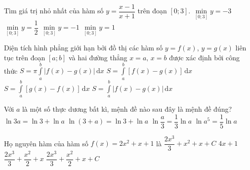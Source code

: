 \begin{ex}%
	Tìm giá trị nhỏ nhất của hàm số $y=\dfrac{x-1}{x+1}$ trên đoạn $[0;3]$.
	\choice
	{$\min\limits_{[0;3]} y=-3$}
	{$\min\limits_{[0;3]}  y=\dfrac{1}{2}$}
	{\True $\min\limits_{[0;3]} y=-1$}
	{$\min\limits_{[0;3]}  y=1$}
\end{ex}

\begin{ex}%
	Diện tích hình phẳng giới hạn bởi đồ thị các hàm số $y=f(x)$, $y=g(x)$ liên tục trên đoạn $[a;b]$ và hai đường thẳng $x=a,\,x=b$ được xác định bởi công thức
	\choice
	{$S=\pi \displaystyle\int\limits_a^b \big|f(x)-g(x)\big|\mathrm{\,d}x$}
	{$S=\displaystyle\int\limits_a^b \left[f(x)-g(x)\right]\mathrm{\,d}x$}
	{$S=\displaystyle\int\limits_a^b \left[g(x)-f(x)\right]\mathrm{\,d}x$}
	{\True $S=\displaystyle\int\limits_a^b \big|f(x)-g(x)\big|\mathrm{\,d}x$}
\end{ex}

\begin{ex}%
	Với $a$ là một số thực dương bất kì, mệnh đề nào sau đây là mệnh đề đúng?
	\choice
	{\True $\ln 3a=\ln 3+\ln a$}
	{$\ln (3+a)=\ln 3+\ln a$}
	{$\ln \dfrac{a}{3}=\dfrac{1}{3}\ln a$}
	{$\ln a^5=\dfrac{1}{5}\ln a$}
\end{ex}

\begin{ex}%
	Họ nguyên hàm của hàm số $f(x)=2x^2+x+1$ là
	\choice
	{$\dfrac{2x^3}{3}+x^2+x+C$}
	{$4x+1$}
	{$\dfrac{2x^3}{3}+\dfrac{x^2}{2}+x$}
	{\True $\dfrac{2x^3}{3}+\dfrac{x^2}{2}+x+C$}
\end{ex}

